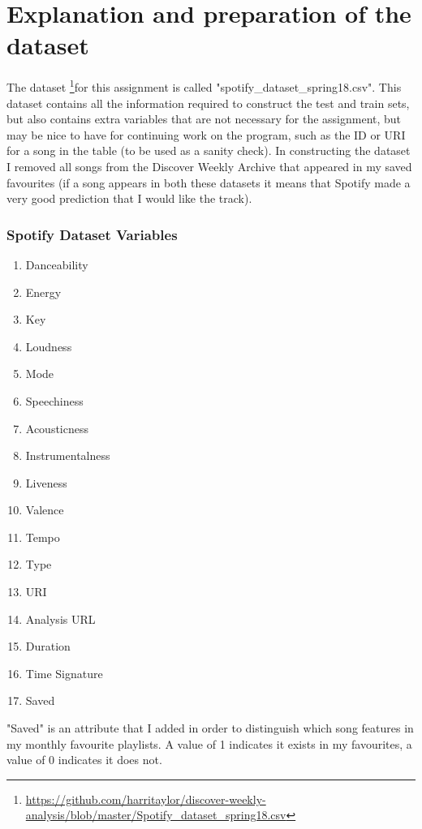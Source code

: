 \documentclass{article}
\begin{document}
    \section{Explanation and preparation of the dataset}
    The dataset \footnote{\url{https://github.com/harritaylor/discover-weekly-analysis/blob/master/Spotify_dataset_spring18.csv}}for this assignment is called "spotify\_dataset\_spring18.csv". This dataset contains all the information required to construct the test and train sets, but also contains extra variables that are not necessary for the assignment, but may be nice to have for continuing work on the program, such as the ID or URI for a song in the table (to be used as a sanity check). In constructing the dataset I removed all songs from the Discover Weekly Archive that appeared in my saved favourites (if a song appears in both these datasets it means that Spotify made a very good prediction that I would like the track).
    
    	\subsubsection{Spotify Dataset Variables}
		\begin{enumerate}
			\item Danceability
			\item Energy
			\item Key
			\item Loudness
			\item Mode
			\item Speechiness
			\item Acousticness
			\item Instrumentalness
			\item Liveness
			\item Valence
			\item Tempo
			\item Type
			\item URI
			\item Analysis URL
			\item Duration
			\item Time Signature
			\item Saved
		\end{enumerate}
		
	"Saved" is an attribute that I added in order to distinguish which song features in my monthly favourite playlists. A value of 1 indicates it exists in my favourites, a value of 0 indicates it does not.
		
\end{document}

